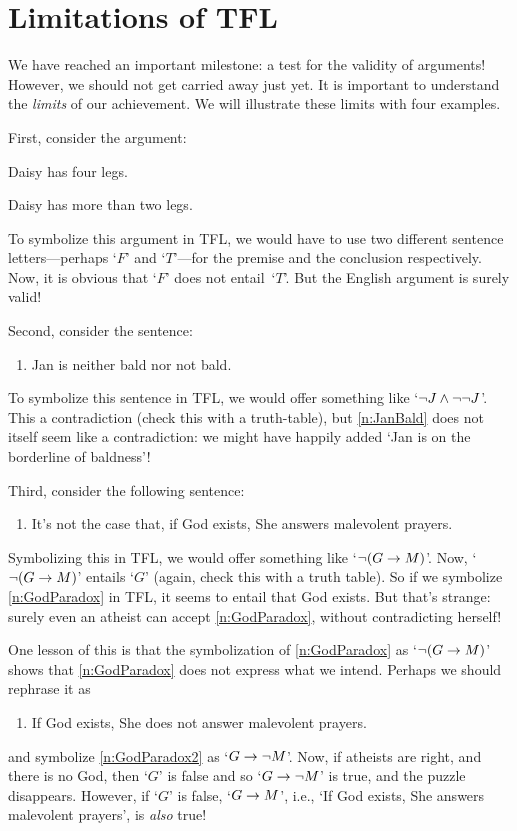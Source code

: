 \chapter{Limitations of TFL}\label{s:ParadoxesOfMaterialConditional}

We have reached an important milestone: a test for the validity of
arguments! However, we should not get carried away just yet. It is
important to understand the \emph{limits} of our achievement. We will
illustrate these limits with four examples.

First, consider the argument: 
	\begin{earg}
		\item Daisy has four legs.
		\item[\texttherefore] Daisy has more than two legs.
	\end{earg}
To symbolize this argument in TFL, we would have to use two different sentence letters---perhaps `$F$'  and `$T$'---for the premise and the conclusion respectively. Now, it is obvious that `$F$' does not entail~`$T$'. But the English argument is surely valid!

Second, consider the sentence:
	\begin{enumerate}
		\item\label{n:JanBald} Jan is neither bald nor not bald.
	\end{enumerate}
To symbolize this sentence in TFL, we would offer something like
`$\neg J \wedge \neg \neg J$'. This a contradiction (check this with
a truth-table), but \cref*{n:JanBald} does not itself seem like a
contradiction: we might have happily added `Jan is on the borderline
of baldness'!

Third, consider the following sentence:
	\begin{enumerate}
	\item\label{n:GodParadox}	It's not the case that, if God exists, She answers malevolent prayers.
	\end{enumerate}
Symbolizing this in TFL, we would offer something like `$\neg (G \rightarrow M)$'. Now, `$\neg (G \rightarrow M)$' entails `$G$' (again, check this with a truth table). So if we symbolize \cref*{n:GodParadox} in TFL, it seems to entail that God exists. But that's strange: surely even an atheist can accept \cref*{n:GodParadox}, without contradicting herself!

One lesson of this is that the symbolization of \cref*{n:GodParadox} as `$\neg(G \rightarrow M)$' shows that \cref*{n:GodParadox} does not express what we intend. Perhaps we should rephrase it as
	\begin{enumerate}
	\item\label{n:GodParadox2} If God exists, She does not answer malevolent prayers.
	\end{enumerate}
and symbolize \cref*{n:GodParadox2} as `$G \rightarrow \neg M$'.  Now, if atheists are right, and there is no God, then `$G$' is false and so `$G \rightarrow \neg M$' is true, and the puzzle disappears. However, if `$G$' is false, `$G \rightarrow M$', i.e., `If God exists, She answers malevolent prayers', is \emph{also} true!

